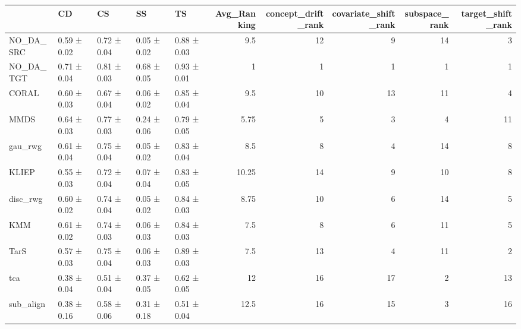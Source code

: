 \begin{tabular}{lllllrrrrr}
\hline
           & CD          & CS          & SS          & TS          &   Avg\_Ranking &   concept\_drift\_rank &   covariate\_shift\_rank &   subspace\_rank &   target\_shift\_rank \\
\hline
 NO\_DA\_SRC & 0.59 ± 0.02 & 0.72 ± 0.04 & 0.05 ± 0.02 & 0.88 ± 0.03 &          9.5  &                   12 &                      9 &              14 &                   3 \\
 NO\_DA\_TGT & 0.71 ± 0.04 & 0.81 ± 0.03 & 0.68 ± 0.05 & 0.93 ± 0.01 &          1    &                    1 &                      1 &               1 &                   1 \\
 CORAL     & 0.60 ± 0.03 & 0.67 ± 0.04 & 0.06 ± 0.02 & 0.85 ± 0.04 &          9.5  &                   10 &                     13 &              11 &                   4 \\
 MMDS      & 0.64 ± 0.03 & 0.77 ± 0.03 & 0.24 ± 0.06 & 0.79 ± 0.05 &          5.75 &                    5 &                      3 &               4 &                  11 \\
 gau\_rwg   & 0.61 ± 0.04 & 0.75 ± 0.04 & 0.05 ± 0.02 & 0.83 ± 0.04 &          8.5  &                    8 &                      4 &              14 &                   8 \\
 KLIEP     & 0.55 ± 0.03 & 0.72 ± 0.04 & 0.07 ± 0.04 & 0.83 ± 0.05 &         10.25 &                   14 &                      9 &              10 &                   8 \\
 disc\_rwg  & 0.60 ± 0.02 & 0.74 ± 0.04 & 0.05 ± 0.02 & 0.84 ± 0.03 &          8.75 &                   10 &                      6 &              14 &                   5 \\
 KMM       & 0.61 ± 0.02 & 0.74 ± 0.03 & 0.06 ± 0.03 & 0.84 ± 0.03 &          7.5  &                    8 &                      6 &              11 &                   5 \\
 TarS      & 0.57 ± 0.03 & 0.75 ± 0.04 & 0.06 ± 0.03 & 0.89 ± 0.03 &          7.5  &                   13 &                      4 &              11 &                   2 \\
 tca       & 0.38 ± 0.04 & 0.51 ± 0.04 & 0.37 ± 0.05 & 0.62 ± 0.05 &         12    &                   16 &                     17 &               2 &                  13 \\
 sub\_align & 0.38 ± 0.16 & 0.58 ± 0.06 & 0.31 ± 0.18 & 0.51 ± 0.04 &         12.5  &                   16 &                     15 &               3 &                  16 \\

\end{tabular}
